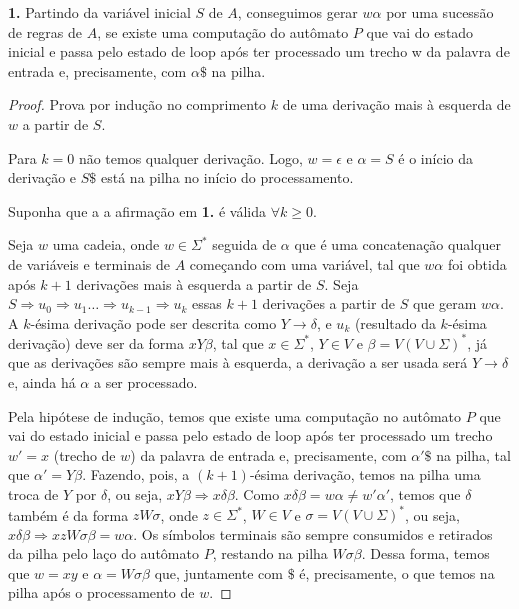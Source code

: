 \textbf{1.} Partindo da variável inicial $S$ de $A$, conseguimos gerar $w\alpha$ por uma sucessão de regras de $A$, se existe uma computação do autômato $P$ que vai do estado inicial e passa pelo estado de loop após ter processado um trecho w da palavra de entrada e, precisamente, com $\alpha\$$ na pilha.
\begin{proof} Prova por indução no comprimento $k$ de uma derivação mais à esquerda de $w$ a partir de $S$.

\indbase Para $k = 0$ não temos qualquer derivação. Logo, $w = \epsilon$ e $\alpha = S$ é o início da derivação e $S\$$ está na pilha no início do processamento.

\indhypo Suponha que a a afirmação em \textbf{1.} é válida $\forall k \geq 0$.

\indstep Seja $w$ uma cadeia, onde $w \in \Sigma^*$ seguida de $\alpha$ que é uma concatenação qualquer de variáveis e terminais de $A$ começando com uma variável, tal que $w\alpha$ foi obtida após $k + 1$ derivações mais à esquerda a partir de $S$. Seja $S \Rightarrow u_0 \Rightarrow u_1 \ldots \Rightarrow u_{k-1} \Rightarrow u_k$ essas $k + 1$ derivações a partir de $S$ que geram $w\alpha$. A $k$-ésima derivação pode ser descrita como $Y \rightarrow \delta$, e $u_k$ (resultado da $k$-ésima derivação) deve ser da forma $xY\beta$, tal que $x \in \Sigma^*$, $Y \in V$ e $\beta = V(V \cup \Sigma)^*$, já que as derivações são sempre mais à esquerda, a derivação a ser usada será $Y \rightarrow \delta$ e, ainda há $\alpha$ a ser processado.

Pela hipótese de indução, temos que existe uma computação no autômato $P$ que vai do estado inicial e passa pelo estado de loop após ter processado um trecho $w' = x$ (trecho de $w$) da palavra de entrada e, precisamente, com $\alpha'\$$ na pilha, tal que $\alpha' = Y\beta$. Fazendo, pois, a $(k+1)$-ésima derivação, temos na pilha uma troca de $Y$ por $\delta$, ou seja, $xY\beta \Rightarrow x\delta\beta$. Como $x\delta\beta = w\alpha \neq w'\alpha'$, temos que $\delta$ também é da forma $zW\sigma$, onde $z \in \Sigma^*$, $W \in V$ e $\sigma = V(V \cup \Sigma)^*$, ou seja, $x\delta\beta \Rightarrow xzW\sigma\beta = w\alpha$. Os símbolos terminais são sempre consumidos e retirados da pilha pelo laço do autômato $P$, restando na pilha $W\sigma\beta$. Dessa forma, temos que $w = xy$ e $\alpha = W\sigma\beta$ que, juntamente com $\$$ é, precisamente, o que temos na pilha após o processamento de $w$.
\end{proof}

